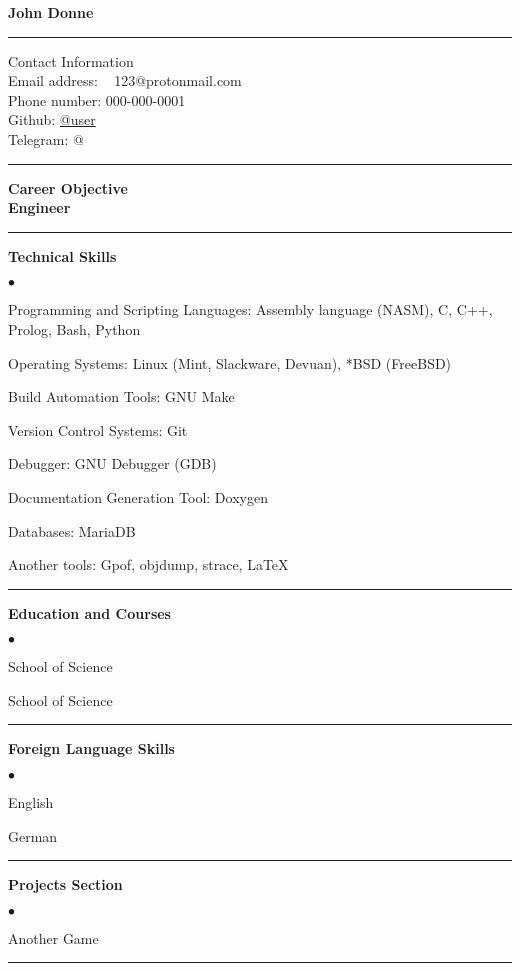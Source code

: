 \documentclass[oneside,final,12pt]{extreport}
\newenvironment{compactlist}{
	\begin{list}{{$\bullet$}}{
		\setlength\leftmargin{0.4cm}
		\setlength\partopsep{0pt}
		\setlength\parskip{0pt}
		\setlength\parsep{0pt}
		\setlength\topsep{0pt}
		\setlength\itemsep{0pt}
	}
}{
	\end{list}
}
\begin{document}
\bfseries
John Donne\\
\rule{\textwidth}{0.4pt}
Contact Information \\
\noindent
\mdseries
Email address: \
123@protonmail.com \\
Phone number:
000-000-0001 \\
Github: 
\href{https://github.com/user}{@user} \\
Telegram:
@ \\
\rule{\textwidth}{0.4pt}

\bfseries
Career Objective \\
\mdseries
Engineer \\
\rule{\textwidth}{0.4pt}

\bfseries
Technical Skills
\mdseries
	\begin{compactlist}
	\item Programming and Scripting Languages: Assembly language (NASM), C, C++, Prolog, Bash, Python 
	\item Operating Systems: Linux (Mint, Slackware, Devuan), *BSD (FreeBSD)
	\item Build Automation Tools: GNU Make
	\item Version Control Systems: Git
	\item Debugger: GNU Debugger (GDB)
	\item Documentation Generation Tool: Doxygen
	\item Databases: MariaDB
	\item Another tools: Gpof, objdump, strace, LaTeX
	\end{compactlist}
\rule{\textwidth}{0.4pt}

\bfseries
Education and Courses
\mdseries
\begin{compactlist}
	\item School of Science
	\item School of Science
\end{compactlist}
\rule{\textwidth}{0.4pt}

\bfseries
Foreign Language Skills
\mdseries
\begin{compactlist}
	\item English
	\item German
\end{compactlist}
\rule{\textwidth}{0.4pt}

\bfseries
Projects Section
\mdseries
\begin{compactlist}
	\item Another Game
\end{compactlist}
\rule{\textwidth}{0.4pt}
\end{document}
